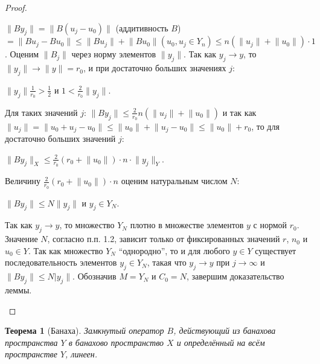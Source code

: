 \documentclass[12pt,a4paper,titlepage,oneside]{book}
\theoremstyle{definition}
\theoremstyle{plain}
\newtheorem*{theorem}{Теорема}
\theoremstyle{remark}
\theoremstyle{remark}
\theoremstyle{remark}
\theoremstyle{remark}
\theoremstyle{plain}
\theoremstyle{plain}
\begin{document}
\begin{proof}
\begin{enumerate}
$\lVert By_j\rVert = \lVert B(u_j - u_0)\rVert$ (аддитивность $B$) $ = \lVert Bu_j - Bu_0\rVert \le \lVert Bu_j\rVert + \lVert Bu_0\rVert(u_0, u_j \in Y_n) \le n(\lVert u_j\rVert + \lVert u_0\rVert)\cdot 1$.
Оценим $\lVert B_j\rVert$ через норму элементов $\lVert y_j\rVert$. Так как $y_j \to y$, то $\lVert y_j\rVert \to \lVert y\rVert=r_0$, и при достаточно больших значениях $j$:

\begin{center}
$\lVert y_j\rVert\frac{1}{r_0}>\frac12$ и $1<\frac{2}{r_0}\lVert y_j\rVert$.
\end{center}

Для таких значений $j$: $\lVert By_j\rVert\le\frac{2}{r_0}n(\lVert u_j\rVert + \lVert u_0\rVert)$ и так как $\lVert u_j\rVert = \lVert u_0 + u_j - u_0\rVert \le \lVert u_0\rVert + \lVert u_j - u_0\rVert \le \lVert u_0\rVert + r_0$, то для достаточно больших значений $j$:

\begin{center}
$\lVert By_j\rVert_X \le \frac{2}{r_0}(r_0 + \lVert u_0\rVert)\cdot n\cdot \lVert y_j\rVert_Y$.
\end{center}

Величину $\frac{2}{r_0}(r_0 + \lVert u_0\rVert)\cdot n$ оценим натуральным числом $N$:

\begin{center}
$\lVert By_j\rVert \le N\lVert y_j\rVert$ и $y_j \in Y_N$.
\end{center}

Так как $y_j \to y$, то множество $Y_N$ плотно в множестве элементов $y$ с нормой $r_0$. Значение $N$, согласно п.п. 1.2, зависит только от фиксированных значений $r$, $n_0$ и $u_0 \in Y$. Так как множество $Y_N$ ``однородно'', то и для любого $y \in Y$ существует последовательность элементов $y_j \in Y_N$, такая что $y_j \to y$ при $j \to \infty$ и $\lVert By_j\rVert \le N\lvert y_j\rVert$. Обозначив $M = Y_N$ и $C_0 = N$, завершим доказательство леммы.

\end{enumerate}

\end{proof}

\begin{theorem}[Банаха]
Замкнутый оператор $B$, действующий из банахова пространства $Y$ в банахово пространство $X$ и определённый на всём пространстве $Y$, линеен.
\end{theorem}
\end{document}
